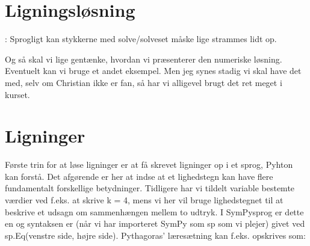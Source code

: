 \documentclass[letterpaper,10pt,english]{jupyterBook}
\begin{document}
\noindent{}

\noindent{}

\begin{sphinxVerbatim}[commandchars=\\\{\}]
   
\end{sphinxVerbatim}

\noindent{}


\section{Ligningsløsning}
\label{\detokenize{notebooks/sympy/Notebook3_ligninger:ligningslosning}}\label{\detokenize{notebooks/sympy/Notebook3_ligninger::doc}}
:
Sprogligt kan stykkerne med solve/solveset måske lige strammes lidt op.

Og så skal vi lige gentænke, hvordan vi præsenterer den numeriske løsning. Eventuelt kan vi bruge et andet eksempel. Men jeg synes stadig vi skal have det med, selv om Christian ikke er fan, så har vi alligevel brugt det ret meget i kurset.


\section{Ligninger}
\label{\detokenize{notebooks/sympy/Notebook3_ligninger:ligninger}}
Første trin for at løse ligninger er at få skrevet ligninger op i et sprog, Pyhton kan forstå. Det afgørende er her at indse at et lighedstegn kan have flere fundamentalt forskellige betydninger. Tidligere har vi tildelt variable bestemte værdier ved f.eks. at skrive k = 4, mens vi her vil bruge lighedstegnet til at beskrive et udsagn om sammenhængen mellem to udtryk. I SymPy\sphinxhyphen{}sprog er dette en  og syntaksen er (når vi har importeret SymPy som sp som vi plejer) givet ved sp.Eq(venstre side, højre side). Pythagoras’ læresætning kan f.eks. opskrives som:
\end{document}
